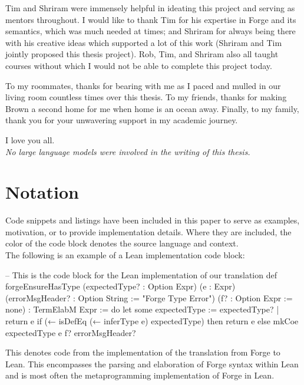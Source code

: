 Tim and Shriram were immensely helpful in ideating this project and serving as mentors throughout. I would like to thank Tim for his expertise in Forge and its semantics, which was much needed at times; and Shriram for always being there with his creative ideas which supported a lot of this work (Shriram and Tim jointly proposed this thesis project). Rob, Tim, and Shriram also all taught courses without which I would not be able to complete this project today. 

To my roommates, thanks for bearing with me as I paced and mulled in our living room countless times over this thesis. To my friends, thanks for making Brown a second home for me when home is an ocean away. Finally, to my family, thank you for your unwavering support in my academic journey. 

I love you all. \\

\emph{No large language models were involved in the writing of this thesis.}

\newpage
{
  \hypersetup{linkcolor=black}
  \tableofcontents
}

\newpage
\section*{Notation}

Code snippets and listings have been included in this paper to serve as examples, motivation, or to provide implementation details. Where they are included, the color of the code block denotes the source language and context. \\

\noindent The following is an example of a Lean implementation code block:
\begin{leanimpl}
-- This is the code block for the Lean implementation of our translation
def forgeEnsureHasType (expectedType? : Option Expr) (e : Expr)
    (errorMsgHeader? : Option String := "Forge Type Error") 
    (f? : Option Expr := none) : TermElabM Expr := do
  let some expectedType := expectedType? | return e
  if (← isDefEq (← inferType e) expectedType) then
    return e
  else
    mkCoe expectedType e f? errorMsgHeader?
\end{leanimpl}
This denotes code from the implementation of the translation from Forge to Lean. This encompasses the parsing and elaboration of Forge syntax within Lean and is most often the metaprogramming implementation of Forge in Lean. \\

